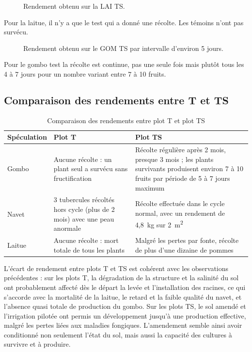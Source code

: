 \begin{figure}[H]
    \centering
    \caption{Rendement obtenu sur la LAI TS. }
    \label{fig:rendement-laitue}
\end{figure} 
Pour la laitue, il n'y a que le test qui a donné une récolte. Les témoins n’ont pas survécu.

\begin{figure}[H]
    \centering
    \caption{Rendement obtenu sur le GOM TS par intervalle d’environ 5 jours. }
    \label{fig:rendement-gombo}
\end{figure} 
Pour le gombo test la récolte est continue, pas une seule fois mais plutôt tous les 4 à 7 jours pour un nombre variant entre 7 à 10 fruits.

\subsection{Comparaison des rendements entre T et TS}

\begin{table}[H]
    \centering
    \caption{Comparaison des rendements entre plot T et plot TS}
    \label{tab:comparaison_rendement}
    \begin{tabular}{|p{2.4cm}|p{5.6cm}|p{6cm}|}
        \hline
        \textbf{Spéculation} & \textbf{Plot T} & \textbf{Plot TS} \\
        \hline
        Gombo & Aucune récolte : un plant seul a survécu sans fructification & Récolte régulière après 2 mois, presque 3 mois ; les plants survivants produisent environ 7 à 10 fruits par période de 5 à 7 jours maximum \\
        \hline
        Navet & 3 tubercules récoltés hors cycle (plus de 2 mois) avec une peau anormale & Récolte effectuée dans le cycle normal, avec un rendement de 4,8~kg sur 2~m\textsuperscript{2} \\
        \hline
        Laitue & Aucune récolte : mort totale de tous les plants & Malgré les pertes par fonte, récolte de plus d'une dizaine de pommes \\
        \hline
    \end{tabular}
\end{table}

L’écart de rendement entre plots T et TS est cohérent avec les observations précédentes : sur les plots T, la dégradation de la structure et la salinité du sol ont probablement affecté dès le départ la levée et l’installation des racines, ce qui s’accorde avec la mortalité de la laitue, le retard et la faible qualité du navet, et l’absence quasi totale de production du gombo. Sur les plots TS, le sol amendé et l’irrigation pilotée ont permis un développement jusqu’à une production effective, malgré les pertes liées aux maladies fongiques. L’amendement semble ainsi avoir conditionné non seulement l’état du sol, mais aussi la capacité des cultures à survivre et à produire.








